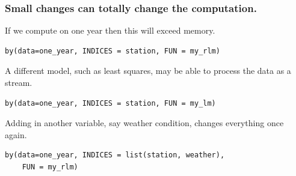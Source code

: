 \documentclass{beamer}
\begin{document}
\begin{frame}[fragile]

    \frametitle{Small changes can totally change the
    computation.}

    If we compute on one year then this will exceed memory.

\begin{verbatim}
by(data=one_year, INDICES = station, FUN = my_rlm)
\end{verbatim}

\pause 

    A different model, such as least squares, may be able to process the
    data as a stream.

\begin{verbatim}
by(data=one_year, INDICES = station, FUN = my_lm)
\end{verbatim}

\pause 

    Adding in another variable, say weather condition, changes everything
    once again.

\begin{verbatim}
by(data=one_year, INDICES = list(station, weather),
    FUN = my_rlm)
\end{verbatim}

%
%

\end{frame}
\end{document}
